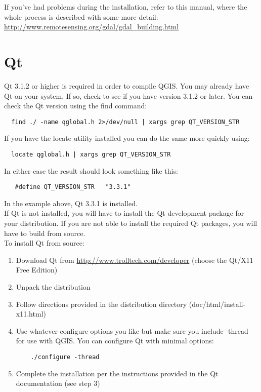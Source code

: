 \documentclass[a4paper,10pt]{article}
\begin{document}
  If you've had problems during the installation, refer to this manual, where the whole process is described with some more detail: \url{http://www.remotesensing.org/gdal/gdal\_building.html} 

  \section{Qt}
  Qt 3.1.2 or higher is required in order to compile QGIS. You may already have Qt on your system. If so, check to see if you have version 3.1.2 or later. You can check the Qt version using the find command:
  \begin{verbatim}
  find ./ -name qglobal.h 2>/dev/null | xargs grep QT_VERSION_STR
  \end{verbatim}
  If you have the locate utility installed you can do the same more quickly using:
  \begin{verbatim}
  locate qglobal.h | xargs grep QT_VERSION_STR
  \end{verbatim}
  In either case the result should look something like this:
  \begin{verbatim}
   #define QT_VERSION_STR   "3.3.1"
   \end{verbatim} 
   In the example above, Qt 3.3.1 is installed.\\
   
  If Qt is not installed, you will have to install the Qt development package for your distribution. If you are not able to install the required Qt packages, you will have to build from source.\\
 
  To install Qt from source:
  \begin{enumerate}
  \item Download Qt from \url{http://www.trolltech.com/developer} (choose the Qt/X11 Free Edition)
  \item Unpack the distribution
  \item Follow directions provided in the distribution directory (doc/html/install-x11.html)
  \item Use whatever configure options you like but make sure you include -thread for use with QGIS. You can configure Qt with minimal options:
  \begin{verbatim}
    ./configure -thread
  \end{verbatim}

  \item Complete the installation per the instructions provided in the Qt documentation (see step 3)
  \end{enumerate}
\end{document}
